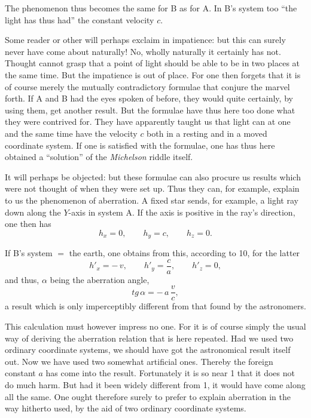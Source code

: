 \documentclass[12pt,a4paper]{article}
\begin{document}
The phenomenon thus becomes the same for B as for A. In B's system too ``the
light has thus had'' the constant velocity $c$.

Some reader or other will perhaps exclaim in impatience: but this can surely
never have come about naturally! No, wholly naturally it certainly has not.
Thought cannot grasp that a point of light should be able to be in two places
at the same time. But the impatience is out of place. For one then forgets
that it is of course merely the mutually contradictory formulae that conjure
the marvel forth. If A and B had the eyes spoken of before, they would quite
certainly, by using them, get
another result. But the formulae have thus here too done what they were
contrived for. They have apparently taught us that light can at one and the
same time have the velocity $c$ both in a resting and in a moved coordinate
system. If one is satisfied with the formulae, one has thus here obtained a
``solution'' of the \emph{Michelson} riddle itself.

It will perhaps be objected: but these formulae can also procure us results
which were not thought of when they were set up. Thus they can, for example,
explain to us the phenomenon of aberration. A fixed star sends, for example, a
light ray down along the $Y$-axis in system A. If the axis is positive in the
ray's direction, one then has
\[
  h_{x} = 0, \qquad h_{y} = c, \qquad h_{z} = 0.
\]

If B's system $=$ the earth, one obtains from this, according to 10, for the
latter
\[
  h'_{x} = -\,v, \qquad h'_{y} = \frac{c}{a}, \qquad h'_{z} = 0,
\]
and thus, $\alpha$ being the aberration angle,
\[
  \mathit{tg}\,\alpha = -\,a\,\frac{v}{c},
\]
a result which is only imperceptibly different from that found by the
astronomers.

This calculation must however impress no one. For it is of course simply the
usual way of deriving the aberration relation that is here repeated. Had we
used two ordinary coordinate systems, we should have got the astronomical
result itself out. Now we have used two somewhat artificial ones. Thereby the
foreign constant $a$ has come into the result. Fortunately it is so near 1
that it does not do much harm. But had it been widely different from 1, it
would have come along all the same. One ought therefore surely to prefer to
explain aberration in the way hitherto used, by the aid of two ordinary
coordinate systems.
\end{document}
